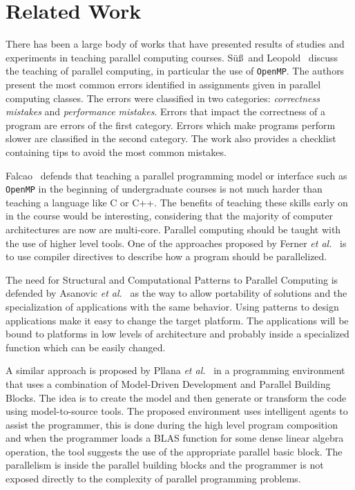 \section{Related Work}
\label{sec:relatedwork}

There has been a large body of works that have presented results of studies and experiments in teaching parallel computing courses. S\"{u}\ss~and Leopold~\cite{SuB:2005:CMO:1892830.1892863} discuss the teaching of parallel computing, in particular the use of \texttt{OpenMP}. The authors present the most common errors identified in assignments given in parallel computing classes. The errors were classified in two categories: \emph{correctness mistakes} and \emph{performance mistakes}. Errors that impact the correctness of a program are errors of the first category. Errors which make programs perform slower are classified in the second category. The work also provides a checklist containing tips to avoid the most common mistakes.

Falcao~\cite{6565518} defends that teaching a parallel programming model or interface such as \texttt{OpenMP} in the beginning of undergraduate courses is not much harder than teaching a language like C or C++. The benefits of teaching these skills early on in the course would be interesting, considering that the majority of computer architectures are now are multi-core. Parallel computing should be taught with the use of higher level tools. One of the approaches proposed by Ferner \textit{et al.}~\cite{6651019} is to use compiler directives to describe how a program should be parallelized.

The need for Structural and Computational Patterns to Parallel Computing is defended by Asanovic \textit{et al.}~\cite{Asanovic2009} as the way to allow portability of solutions and the specialization of applications with the same behavior. Using patterns to design applications make it easy to change the target platform. The applications will be bound to platforms in low levels of architecture and probably inside a specialized function which can be easily changed. 

A similar approach is proposed by Pllana \textit{et al.}~\cite{Pllana:2009} in a programming environment that uses a combination of Model-Driven Development and Parallel Building Blocks. The idea is to create the model and then generate or transform the code using model-to-source tools. The proposed environment uses intelligent agents to assist the programmer, this is done during the high level program composition and when the programmer loads a BLAS function for some dense linear algebra operation, the tool suggests the use of the appropriate parallel basic block. The parallelism is inside the parallel building blocks and the programmer is not exposed directly to the complexity of parallel programming problems.


